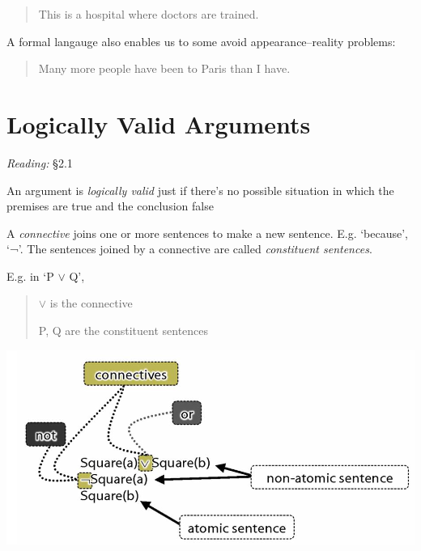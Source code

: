 \documentclass[12pt]{extarticle}
\begin{document}
\begin{multicols*}{3}
\begin{quote}
 
This is a hospital where doctors are trained.
 
\end{quote}
 
A formal langauge also enables us to some avoid appearance--reality problems:
 
\begin{quote}
 
Many more people have been to Paris than I have.
 
\end{quote}
 
 
 
\section{Logically Valid Arguments}
 
\emph{Reading:} §2.1
 
An argument is \emph{logically valid} just if there’s no possible situation in which the premises are true and the conclusion false
 
A \emph{connective} joins one or more sentences to make a new sentence. E.g. ‘because’, ‘¬’. The sentences joined by a connective are called \emph{constituent sentences}.
 
E.g. in ‘P $\lor{}$ Q’,
 
\begin{quote}
 
$\lor{}$ is the connective
 
P, Q are the constituent sentences
 
\end{quote}
 
\begin{center}
\includegraphics[scale=0.3]{img/terminology_more.png}
\end{center}
 

\end{multicols*}
\end{document}
